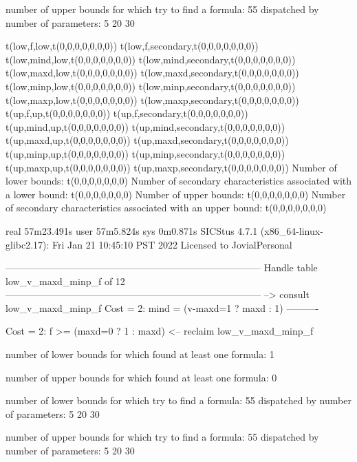 number of upper bounds for which try to find a formula: 55
dispatched by number of parameters: 5  20  30

t(low,f,low,t(0,0,0,0,0,0,0))
t(low,f,secondary,t(0,0,0,0,0,0,0))
t(low,mind,low,t(0,0,0,0,0,0,0))
t(low,mind,secondary,t(0,0,0,0,0,0,0))
t(low,maxd,low,t(0,0,0,0,0,0,0))
t(low,maxd,secondary,t(0,0,0,0,0,0,0))
t(low,minp,low,t(0,0,0,0,0,0,0))
t(low,minp,secondary,t(0,0,0,0,0,0,0))
t(low,maxp,low,t(0,0,0,0,0,0,0))
t(low,maxp,secondary,t(0,0,0,0,0,0,0))
t(up,f,up,t(0,0,0,0,0,0,0))
t(up,f,secondary,t(0,0,0,0,0,0,0))
t(up,mind,up,t(0,0,0,0,0,0,0))
t(up,mind,secondary,t(0,0,0,0,0,0,0))
t(up,maxd,up,t(0,0,0,0,0,0,0))
t(up,maxd,secondary,t(0,0,0,0,0,0,0))
t(up,minp,up,t(0,0,0,0,0,0,0))
t(up,minp,secondary,t(0,0,0,0,0,0,0))
t(up,maxp,up,t(0,0,0,0,0,0,0))
t(up,maxp,secondary,t(0,0,0,0,0,0,0))
Number of lower bounds:                                             t(0,0,0,0,0,0,0)
Number of secondary characteristics associated with a lower bound:  t(0,0,0,0,0,0,0)
Number of upper bounds:                                             t(0,0,0,0,0,0,0)
Number of secondary characteristics associated with an upper bound: t(0,0,0,0,0,0,0)

real	57m23.491s
user	57m5.824s
sys	0m0.871s
SICStus 4.7.1 (x86_64-linux-glibc2.17): Fri Jan 21 10:45:10 PST 2022
Licensed to JovialPersonal


--------------------------------------------------------------------------------
Handle table low_v_maxd_minp_f of 12
--------------------------------------------------------------------------------
--> consult low_v_maxd_minp_f
Cost =  2:  mind = (v-maxd=1 ? maxd : 1)
----------

Cost =  2:  f >= (maxd=0 ? 1 : maxd)
<-- reclaim low_v_maxd_minp_f

number of lower bounds for which found at least one formula: 1

number of upper bounds for which found at least one formula: 0

number of lower bounds for which try to find a formula: 55
dispatched by number of parameters: 5  20  30

number of upper bounds for which try to find a formula: 55
dispatched by number of parameters: 5  20  30


